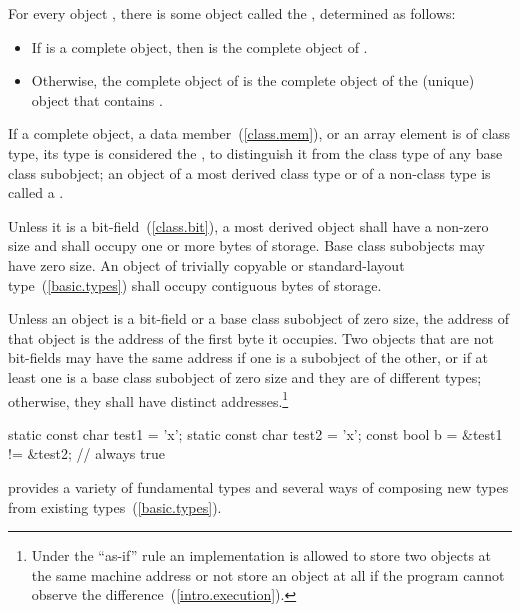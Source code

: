 \pnum
For every object , there is some object called the
 , determined as follows:

\begin{itemize}

\item
If  is a complete object, then  is the complete
object of .

\item
Otherwise, the complete object of  is the complete object
of the (unique) object that contains .

\end{itemize}

\pnum
If a complete object, a data member~(\ref{class.mem}), or an array element is of
class type, its type is considered the , to distinguish it from the class type of any base class subobject;
an object of a most derived class type or of a non-class type is called a
.

\pnum
{}%
Unless it is a bit-field~(\ref{class.bit}), a most derived object shall have a
non-zero size and shall occupy one or more bytes of storage. Base class
subobjects may have zero size. An object of trivially copyable or
standard-layout type~(\ref{basic.types}) shall occupy contiguous bytes of
storage.

\pnum
{}%
%
Unless an object is a bit-field or a base class subobject of zero size, the
address of that object is the address of the first byte it occupies. Two
objects that are not bit-fields
may have the same address if one is a subobject of the other, or if at least
one is a base class subobject of zero size and they are of different types;
otherwise, they shall have distinct addresses.\footnote{Under the ``as-if'' rule an
implementation is allowed to store two objects at the same machine address or
not store an object at all if the program cannot observe the
difference~(\ref{intro.execution}).}

\enterexample
\begin{codeblock}
static const char test1 = 'x';
static const char test2 = 'x';
const bool b = &test1 != &test2;      // always true
\end{codeblock}
\exitexample

\pnum
\enternote 
\Cpp  provides a variety of fundamental types and several ways of composing
new types from existing types~(\ref{basic.types}).
\exitnote%

